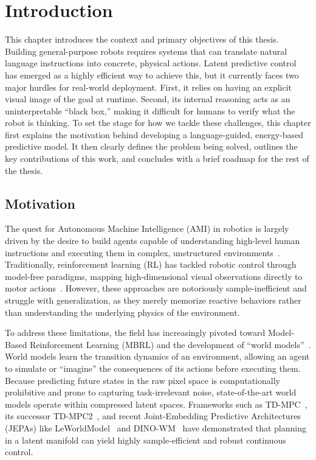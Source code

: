 \chapter{Introduction}
\label{sec:introduction}

This chapter introduces the context and primary objectives of this thesis. Building general-purpose robots requires systems that can translate natural language instructions into concrete, physical actions. Latent predictive control has emerged as a highly efficient way to achieve this, but it currently faces two major hurdles for real-world deployment. First, it relies on having an explicit visual image of the goal at runtime. Second, its internal reasoning acts as an uninterpretable ``black box,'' making it difficult for humans to verify what the robot is thinking. To set the stage for how we tackle these challenges, this chapter first explains the motivation behind developing a language-guided, energy-based predictive model. It then clearly defines the problem being solved, outlines the key contributions of this work, and concludes with a brief roadmap for the rest of the thesis.

\section{Motivation}
\label{sec:intro_motivation}

The quest for Autonomous Machine Intelligence (AMI) in robotics is largely driven by the desire to build agents capable of understanding high-level human instructions and executing them in complex, unstructured environments~\cite{lecun2022path}. Traditionally, reinforcement learning (RL) has tackled robotic control through model-free paradigms, mapping high-dimensional visual observations directly to motor actions~\cite{nair2018visual}. However, these approaches are notoriously sample-inefficient and struggle with generalization, as they merely memorize reactive behaviors rather than understanding the underlying physics of the environment.

To address these limitations, the field has increasingly pivoted toward Model-Based Reinforcement Learning (MBRL) and the development of ``world models''~\cite{haarnoja2017reinforcement}. World models learn the transition dynamics of an environment, allowing an agent to simulate or ``imagine'' the consequences of its actions before executing them. Because predicting future states in the raw pixel space is computationally prohibitive and prone to capturing task-irrelevant noise, state-of-the-art world models operate within compressed latent spaces. Frameworks such as TD-MPC~\cite{Hansen2022tdmpc}, its successor TD-MPC2~\cite{hansen2024tdmpc2}, and recent Joint-Embedding Predictive Architectures (JEPAs) like LeWorldModel~\cite{Maes2026LeWorldModelSE} and DINO-WM~\cite{zhou2025dinowm} have demonstrated that planning in a latent manifold can yield highly sample-efficient and robust continuous control.

